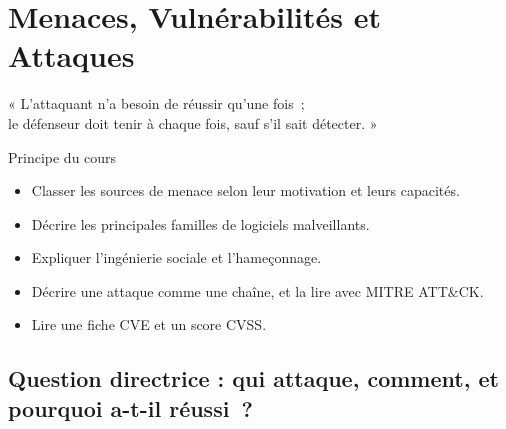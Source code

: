 
\chapter{Menaces, Vulnérabilités et Attaques}
\label{chap:menaces}

\epigraph{%
    « L'attaquant n'a besoin de réussir qu'une fois~;\\
    le défenseur doit tenir à chaque fois, sauf s'il sait détecter. »%
}{Principe du cours}


\begin{boxobjectifs}
\begin{itemize}
    \item Classer les sources de menace selon leur motivation et leurs
          capacités.
    \item Décrire les principales familles de logiciels malveillants.
    \item Expliquer l'ingénierie sociale et l'hameçonnage.
    \item Décrire une attaque comme une chaîne, et la lire avec MITRE
          ATT\&CK.
    \item Lire une fiche CVE et un score CVSS.
\end{itemize}
\end{boxobjectifs}

\bigskip

\section*{Question directrice : qui attaque, comment, et pourquoi a-t-il réussi~?}

